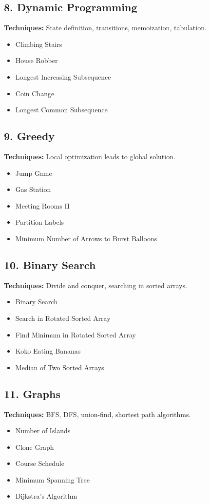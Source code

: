 \documentclass{article}
\begin{document}
\subsection*{8. Dynamic Programming}
\textbf{Techniques:} State definition, transitions, memoization, tabulation.
\begin{itemize}[noitemsep]
    \item Climbing Stairs
    \item House Robber
    \item Longest Increasing Subsequence
    \item Coin Change
    \item Longest Common Subsequence
\end{itemize}

\subsection*{9. Greedy}
\textbf{Techniques:} Local optimization leads to global solution.
\begin{itemize}[noitemsep]
    \item Jump Game
    \item Gas Station
    \item Meeting Rooms II
    \item Partition Labels
    \item Minimum Number of Arrows to Burst Balloons
\end{itemize}

\subsection*{10. Binary Search}
\textbf{Techniques:} Divide and conquer, searching in sorted arrays.
\begin{itemize}[noitemsep]
    \item Binary Search
    \item Search in Rotated Sorted Array
    \item Find Minimum in Rotated Sorted Array
    \item Koko Eating Bananas
    \item Median of Two Sorted Arrays
\end{itemize}

\subsection*{11. Graphs}
\textbf{Techniques:} BFS, DFS, union-find, shortest path algorithms.
\begin{itemize}[noitemsep]
    \item Number of Islands
    \item Clone Graph
    \item Course Schedule
    \item Minimum Spanning Tree
    \item Dijkstra's Algorithm
\end{itemize}
\end{document}
